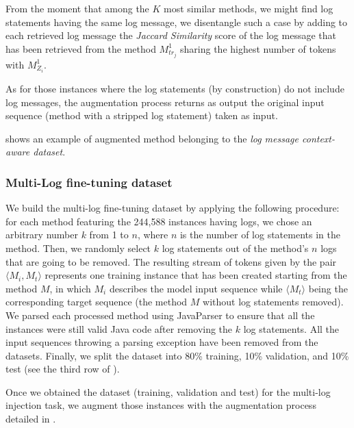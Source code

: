 From the moment that among the $K$ most similar methods, we might find log statements having the same log message, we disentangle such a case by adding to each retrieved log message the \textit{Jaccard Similarity} score of the log message that has been retrieved from the method $M_{tr_j}^{1}$ sharing the highest number of tokens with $M_{Z_i}^{1}$.

As for those instances where the log statements (by construction) do not include log messages, the augmentation process returns as output the original input sequence (\ie \java method with a stripped log statement) taken as input.


\figref{} shows an example of augmented \java method belonging to the \textit{log message context-aware dataset}.



\subsubsection{Multi-Log fine-tuning dataset}

We build the multi-log fine-tuning dataset by applying the following procedure: for each method featuring the 244,588 instances having logs, we chose an arbitrary number $k$ from 1 to $n$, where $n$ is the number of log statements in the method. Then, we randomly select $k$ log statements out of the method's $n$ logs that are going to be removed. 
The resulting stream of tokens given by the pair $\langle M_i, M_t \rangle$ represents one training instance that has been created starting from the method $M$, in which $M_i$ describes the model input sequence while $\langle M_t \rangle$ being  the corresponding target sequence (\ie the method $M$ without log statements removed). 
We parsed each processed method using JavaParser \cite{javaparser} to ensure that all the instances were still valid Java code after removing the $k$ log statements. 
All the input sequences throwing a parsing exception have been removed from the datasets. Finally, we split the dataset into 80\% training, 10\% validation, and 10\% test (see the third row of ).

Once we obtained the dataset (\ie training, validation and test) for the multi-log injection task, we augment those instances with the augmentation process detailed in .

